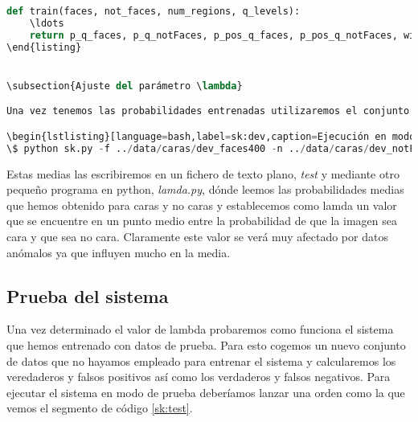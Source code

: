 \begin{lstlisting}[language=python,label=roc:rocdata,caption=EDA con la que gestionar la curva ROC]
def train(faces, not_faces, num_regions, q_levels):
    \ldots
    return p_q_faces, p_q_notFaces, p_pos_q_faces, p_pos_q_notFaces, width
\end{listing}


\subsection{Ajuste del parámetro \lambda}

Una vez tenemos las probabilidades entrenadas utilizaremos el conjunto de test y calcularemos la probabilidad de que sea cara o no cara utilizando la regla de decisión descrita por Schneiderman y Kanade e imprimimos la media de las probabilidades de que la imagen sea cara y la media de las probabilidades de que la imagen no sea cara. Podemos ver un ejemplo de como ejecutar el algoritmo en modo desarrrollo en el segmento de código \ref{sk:dev}.\par

\begin{lstlisting}[language=bash,label=sk:dev,caption=Ejecución en modo desarrollo]
\$ python sk.py -f ../data/caras/dev_faces400 -n ../data/caras/dev_notFaces400 -d 
\end{lstlisting}

Estas medias las escribiremos en un fichero de texto plano, \textit{test} y mediante otro pequeño programa en python, \textit{lamda.py}, dónde leemos las probabilidades medias que hemos obtenido para caras y no caras y establecemos como lamda un valor que se encuentre en un punto medio entre la probabilidad de que  la imagen sea cara y que sea no cara. Claramente este valor se verá muy afectado por datos anómalos ya que influyen mucho en la media.\par

\subsection{Prueba del sistema}

Una vez determinado el valor de lambda probaremos como funciona el sistema que hemos entrenado con datos de prueba. Para esto cogemos un nuevo conjunto de datos que no hayamos empleado para entrenar el sistema y calcularemos los veredaderos y falsos positivos así como los verdaderos y falsos negativos. Para ejecutar el sistema en modo de prueba deberíamos lanzar una orden como la que vemos el segmento de código \ref{sk:test}.

